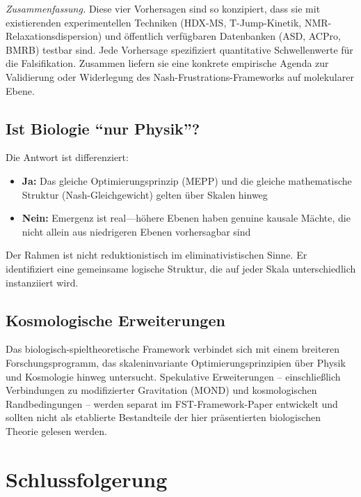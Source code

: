 \documentclass[12pt,a4paper]{article}
\theoremstyle{remark}
\begin{document}
\medskip

\noindent\textit{Zusammenfassung.} Diese vier Vorhersagen sind so konzipiert, dass sie mit existierenden experimentellen Techniken (HDX-MS, T-Jump-Kinetik, NMR-Relaxationsdispersion) und \"offentlich verf\"ugbaren Datenbanken (ASD, ACPro, BMRB) testbar sind. Jede Vorhersage spezifiziert quantitative Schwellenwerte f\"ur die Falsifikation. Zusammen liefern sie eine konkrete empirische Agenda zur Validierung oder Widerlegung des Nash-Frustrations-Frameworks auf molekularer Ebene.

\subsection{Ist Biologie ``nur Physik''?}

Die Antwort ist differenziert:
\begin{itemize}
    \item \textbf{Ja:} Das gleiche Optimierungsprinzip (MEPP) und die gleiche mathematische Struktur (Nash-Gleichgewicht) gelten \"uber Skalen hinweg
    \item \textbf{Nein:} Emergenz ist real---h\"ohere Ebenen haben genuine kausale M\"achte, die nicht allein aus niedrigeren Ebenen vorhersagbar sind
\end{itemize}

Der Rahmen ist nicht reduktionistisch im eliminativistischen Sinne. Er identifiziert eine gemeinsame logische Struktur, die auf jeder Skala unterschiedlich instanziiert wird.

\subsection{Kosmologische Erweiterungen}
\label{sec:cosmology}

Das biologisch-spieltheoretische Framework verbindet sich mit einem breiteren Forschungsprogramm, das skaleninvariante Optimierungsprinzipien \"uber Physik und Kosmologie hinweg untersucht. Spekulative Erweiterungen -- einschlie\ss{}lich Verbindungen zu modifizierter Gravitation (MOND) und kosmologischen Randbedingungen -- werden separat im FST-Framework-Paper \citep{FST-Unified2026} entwickelt und sollten nicht als etablierte Bestandteile der hier pr\"asentierten biologischen Theorie gelesen werden.

\section{Schlussfolgerung}
\label{sec:conclusion}
\end{document}
